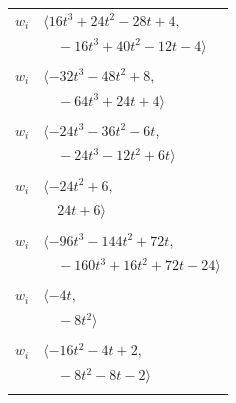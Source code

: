 \documentclass[11pt]{article}
\begin{document}
\begin{longtable}{@{}ll@{}}
$w_i$ & $\langle 16t^{3}+24t^{2}-28t+4,$\\
 & $\quad -16t^{3}+40t^{2}-12t-4\rangle$\\
\addlinespace[2pt]
\multicolumn{2}{@{}p{0.97\textwidth}@{}}{$i=16$, $D_i=1$, $\rho_{ij}$: $0{:}2, \allowbreak 3{:}2, \allowbreak 6{:}2, \allowbreak 7{:}2, \allowbreak 14{:}1, \allowbreak 15{:}2$}\\
$w_i$ & $\langle -32t^{3}-48t^{2}+8,$\\
 & $\quad -64t^{3}+24t+4\rangle$\\
\addlinespace[2pt]
\multicolumn{2}{@{}p{0.97\textwidth}@{}}{$i=17$, $D_i=1$, $\rho_{ij}$: $4{:}1, \allowbreak 8{:}1, \allowbreak 9{:}2, \allowbreak 14{:}2, \allowbreak 15{:}1, \allowbreak 18{:}1, \allowbreak 21{:}1, \allowbreak 23{:}1$}\\
$w_i$ & $\langle -24t^{3}-36t^{2}-6t,$\\
 & $\quad -24t^{3}-12t^{2}+6t\rangle$\\
\addlinespace[2pt]
\multicolumn{2}{@{}p{0.97\textwidth}@{}}{$i=18$, $D_i=2$, $\rho_{ij}$: $3{:}2, \allowbreak 4{:}2, \allowbreak 15{:}2, \allowbreak 17{:}2, \allowbreak 24{:}2$}\\
$w_i$ & $\langle -24t^{2}+6,$\\
 & $\quad 24t+6\rangle$\\
\addlinespace[2pt]
\multicolumn{2}{@{}p{0.97\textwidth}@{}}{$i=19$, $D_i=1$, $\rho_{ij}$: $1{:}2, \allowbreak 2{:}2, \allowbreak 6{:}2, \allowbreak 8{:}2, \allowbreak 13{:}2, \allowbreak 14{:}1, \allowbreak 20{:}2, \allowbreak 21{:}2$}\\
$w_i$ & $\langle -96t^{3}-144t^{2}+72t,$\\
 & $\quad -160t^{3}+16t^{2}+72t-24\rangle$\\
\addlinespace[2pt]
\multicolumn{2}{@{}p{0.97\textwidth}@{}}{$i=20$, $D_i=1$, $\rho_{ij}$: $4{:}1, \allowbreak 6{:}2, \allowbreak 7{:}1, \allowbreak 10{:}1, \allowbreak 15{:}2, \allowbreak 19{:}1, \allowbreak 24{:}1$}\\
$w_i$ & $\langle -4t,$\\
 & $\quad -8t^{2}\rangle$\\
\addlinespace[2pt]
\multicolumn{2}{@{}p{0.97\textwidth}@{}}{$i=21$, $D_i=1$, $\rho_{ij}$: $2{:}1, \allowbreak 3{:}1, \allowbreak 4{:}1, \allowbreak 5{:}1, \allowbreak 17{:}2, \allowbreak 19{:}1$}\\
$w_i$ & $\langle -16t^{2}-4t+2,$\\
 & $\quad -8t^{2}-8t-2\rangle$\\
\addlinespace[2pt]

\end{longtable}
\end{document}

